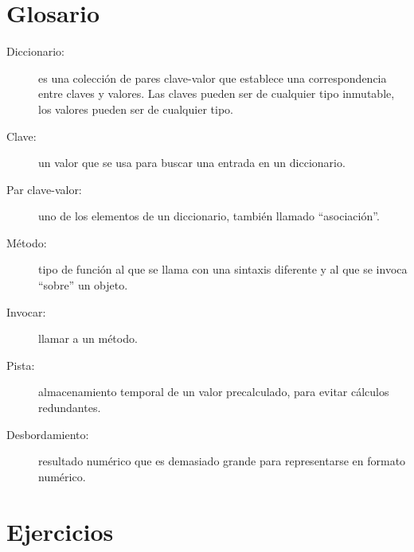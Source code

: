  

\section{Glosario}
\begin{description}
\item [{Diccionario:}] es una colección de pares clave-valor que establece
una correspondencia entre claves y valores. Las claves pueden ser
de cualquier tipo inmutable, los valores pueden ser de cualquier tipo.
\item [{Clave:}] un valor que se usa para buscar una entrada en un diccionario.
\item [{Par clave-valor:}] uno de los elementos de un diccionario, también
llamado ``asociación''.
\item [{Método:}] tipo de función al que se llama con una sintaxis diferente
y al que se invoca ``sobre'' un objeto.
\item [{Invocar:}] llamar a un método.
\item [{Pista:}] almacenamiento temporal de un valor precalculado, para
evitar cálculos redundantes.
\item [{Desbordamiento:}] resultado numérico que es demasiado grande para
representarse en formato numérico.

   
 
\end{description}

\section{Ejercicios}

